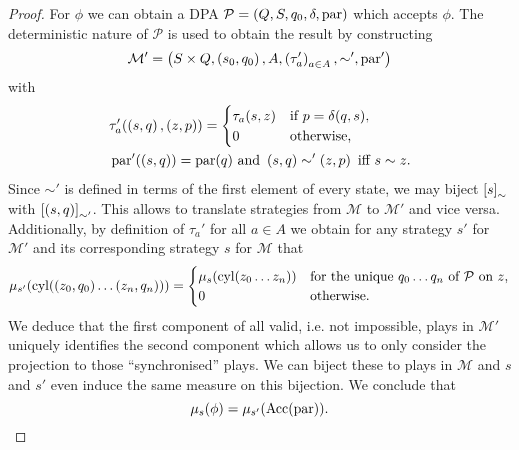 \begin{proof}
  For $\phi$ we can obtain a \ac{DPA} 
  $\mathcal{P} = \left(Q, S, q_{0}, \delta, \operatorname{par}\right)$ which accepts $\phi$.
  The deterministic nature of $\mathcal{P}$ is used to obtain the result by
  constructing
  \begin{equation*}
    \mathcal{M'} = \left(S\times Q, \left(s_{0}, q_{0}\right), A, 
    \left(\tau'_{a}\right)_{a\in A}, \sim', \operatorname{par}'\right)
  \end{equation*}
  with
  \begin{align*}
    &\tau'_{a}(\left(s, q\right), \left(z, p\right)) = \begin{cases}
      \tau_{a}(s, z)&\text{if }p = \delta(q,s),\\
      0&\text{otherwise,}
    \end{cases}\\
    &\operatorname{par}'(\left(s,q\right)) = \operatorname{par}(q)
    \text{ and }
    \left(s, q\right)\sim'\left(z, p\right)\text{ iff }s\sim z.
  \end{align*}
  Since $\sim'$ is defined in terms of the first element of every state, we may
  biject $\left[s\right]_{\sim}$ with $\left[\left(s, q\right)\right]_{\sim'}$. This 
  allows to translate strategies from $\mathcal{M}$ to $\mathcal{M'}$ and vice
  versa. Additionally, by definition of $\tau_{a}'$ for all $a\in A$ we 
  obtain for any strategy $s'$ for $\mathcal{M'}$ and its corresponding 
  strategy $s$ for $\mathcal{M}$ that
  \begin{equation*}
    \mu_{s'}(\operatorname{cyl}(\left(z_{0}, q_{0}\right)\dots\left(z_{n}, q_{n}\right))) = 
    \begin{cases}
      \mu_{s}(\operatorname{cyl}(z_{0}\dots z_{n}))&\text{for the unique }
        q_{0}\dots q_{n}\text{ of }\mathcal{P}\text{ on }z,\\
      0&\text{otherwise.}
    \end{cases}
  \end{equation*}
  We deduce that the first component of all valid, i.e. not impossible, 
  plays in $\mathcal{M}'$ uniquely identifies the second component which allows 
  us to only consider the projection to those \enquote{synchronised} plays.
  We can biject these to plays in $\mathcal{M}$ and $s$ and $s'$ even 
  induce the same measure on this bijection. We conclude that
  \begin{equation*}
    \mu_{s}(\phi) = \mu_{s'}(\operatorname{Acc}(\operatorname{par})).
  \end{equation*}
\end{proof}

